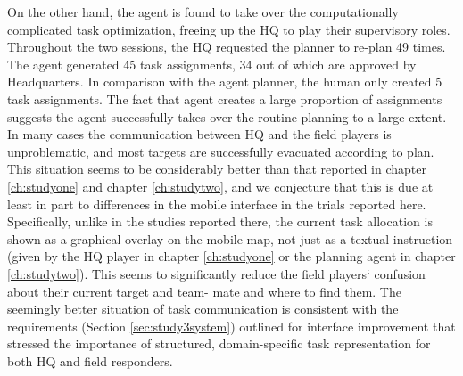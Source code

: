 
On the other hand, the agent is found to take over the computationally complicated task optimization, freeing up the HQ to play their supervisory roles. Throughout the two sessions, the HQ requested the planner to re-plan 49 times. The agent generated 45 task assignments, 34 out of which are approved by Headquarters. In comparison with the agent planner, the human only created 5 task assignments. The fact that agent creates a large proportion of assignments suggests the agent successfully takes over the routine planning to a large extent. \\

In many cases the communication between HQ and the field players is unproblematic, and most targets are successfully evacuated according to plan. This situation seems to be considerably better than that reported in chapter \ref{ch:studyone} and chapter \ref{ch:studytwo}, and we conjecture that this is due at least in part to differences in the mobile interface in the trials reported here. Specifically, unlike in the studies reported there, the current task allocation is shown as a graphical overlay on the mobile map, not just as a textual instruction (given by the HQ player in chapter \ref{ch:studyone} or the planning agent in chapter \ref{ch:studytwo}). This seems to significantly reduce the field players` confusion about their current target and team- mate and where to find them. The seemingly better situation of task communication is consistent with the requirements (Section \ref{sec:study3system}) outlined for interface improvement that stressed the importance of structured, domain-specific task representation for both HQ and field responders.  \\


